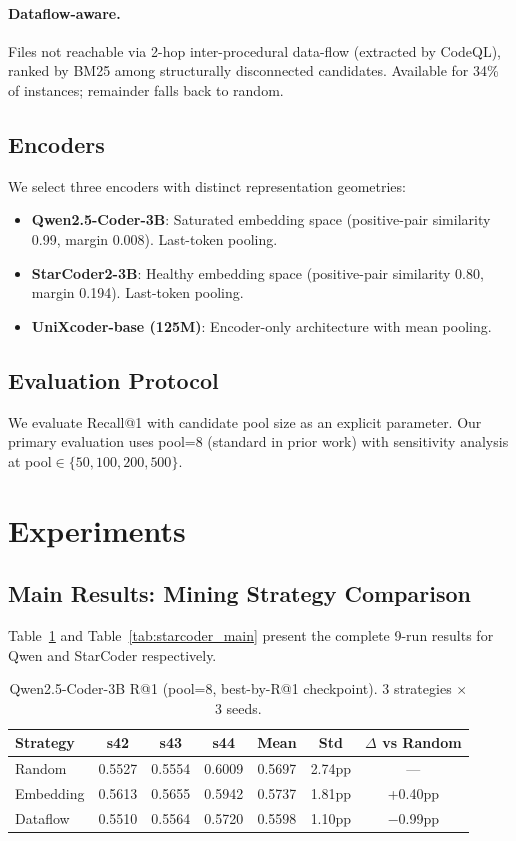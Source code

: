 \documentclass[11pt]{article}
\begin{document}
\paragraph{Dataflow-aware.} Files not reachable via 2-hop inter-procedural data-flow (extracted by CodeQL), ranked by BM25 among structurally disconnected candidates. Available for 34\% of instances; remainder falls back to random.

\subsection{Encoders}

We select three encoders with distinct representation geometries:
\begin{itemize}
    \item \textbf{Qwen2.5-Coder-3B}: Saturated embedding space (positive-pair similarity 0.99, margin 0.008). Last-token pooling.
    \item \textbf{StarCoder2-3B}: Healthy embedding space (positive-pair similarity 0.80, margin 0.194). Last-token pooling.
    \item \textbf{UniXcoder-base (125M)}: Encoder-only architecture with mean pooling.
\end{itemize}

\subsection{Evaluation Protocol}

We evaluate Recall@1 with candidate pool size as an explicit parameter. Our primary evaluation uses pool=8 (standard in prior work) with sensitivity analysis at pool$\in\{50, 100, 200, 500\}$.

\section{Experiments}

\subsection{Main Results: Mining Strategy Comparison}

Table~\ref{tab:qwen_main} and Table~\ref{tab:starcoder_main} present the complete 9-run results for Qwen and StarCoder respectively.

\begin{table}[h]
\centering
\caption{Qwen2.5-Coder-3B R@1 (pool=8, best-by-R@1 checkpoint). 3 strategies $\times$ 3 seeds.}
\label{tab:qwen_main}
\begin{tabular}{lcccccc}
\toprule
Strategy & s42 & s43 & s44 & Mean & Std & $\Delta$ vs Random \\
\midrule
Random & 0.5527 & 0.5554 & 0.6009 & 0.5697 & 2.74pp & --- \\
Embedding & 0.5613 & 0.5655 & 0.5942 & 0.5737 & 1.81pp & +0.40pp \\
Dataflow & 0.5510 & 0.5564 & 0.5720 & 0.5598 & 1.10pp & $-$0.99pp \\
\bottomrule
\end{tabular}
\end{table}
\end{document}
